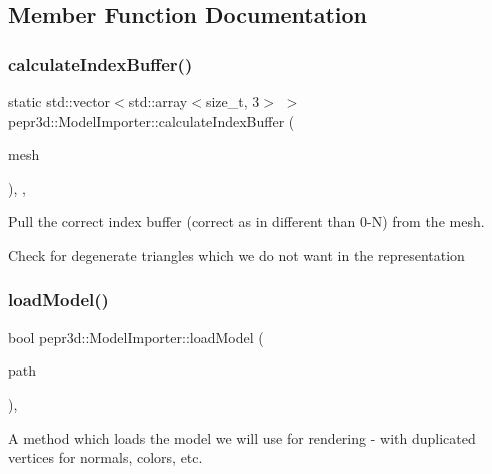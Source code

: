 \subsection{Member Function Documentation}
\mbox{\label{classpepr3d_1_1_model_importer_aa537966d73404c3f4c463799030a1d2b}} 
\subsubsection{\texorpdfstring{calculateIndexBuffer()}{calculateIndexBuffer()}}
{\footnotesize\ttfamily static std\+::vector$<$std\+::array$<$size\+\_\+t, 3$>$ $>$ pepr3d\+::\+Model\+Importer\+::calculate\+Index\+Buffer (\begin{DoxyParamCaption}\item[{ai\+Mesh $\ast$}]{mesh }\end{DoxyParamCaption})\hspace{0.3cm}{\ttfamily [inline]}, {\ttfamily [static]}, {\ttfamily [private]}}



Pull the correct index buffer (correct as in different than 0-\/N) from the mesh. 

Check for degenerate triangles which we do not want in the representation \mbox{\label{classpepr3d_1_1_model_importer_aa3ee5189df6ae1d8530915fe8cc964e7}} 
\subsubsection{\texorpdfstring{loadModel()}{loadModel()}}
{\footnotesize\ttfamily bool pepr3d\+::\+Model\+Importer\+::load\+Model (\begin{DoxyParamCaption}\item[{const std\+::string \&}]{path }\end{DoxyParamCaption})\hspace{0.3cm}{\ttfamily [inline]}, {\ttfamily [private]}}



A method which loads the model we will use for rendering -\/ with duplicated vertices for normals, colors, etc. 

